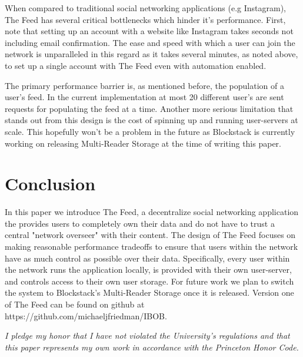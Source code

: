 \documentclass[pageno]{jpaper}
\begin{document}
\begin{multicols*}{2}
When compared to traditional social networking applications (e.g Instagram), The Feed has several critical bottlenecks which hinder it's performance. First, note that setting up an account with a website like Instagram takes seconds not including email confirmation. The ease and speed with which a user can join the network is unparalleled in this regard as it takes several minutes, as noted above, to set up a single account with The Feed even with automation enabled.\par
The primary performance barrier is, as mentioned before, the population of a user's feed. In the current implementation at most 20 different user's are sent requests for populating the feed at a time. Another more serious limitation that stands out from this design is the cost of spinning up and running user-servers at scale. This hopefully won't be a problem in the future as Blockstack is currently working on releasing Multi-Reader Storage at the time of writing this paper.

\section{Conclusion}
\label{section:conclusion}

In this paper we introduce The Feed, a decentralize social networking application the provides users to completely own their data and do not have to trust a central "network overseer" with their content. The design of The Feed focuses on making reasonable performance tradeoffs to ensure that users within the network have as much control as possible over their data. Specifically, every user within the network runs the application locally, is provided with their own user-server, and controls access to their own user storage. For future work we plan to switch the system to Blockstack's Multi-Reader Storage once it is released. Version one of The Feed can be found on github at https://github.com/michaeljfriedman/IBOB. \newline





\textit{I pledge my honor that I have not violated the University's regulations and that this paper represents my own work in accordance with the Princeton Honor Code.}\par
\end{multicols*}
\end{document}
